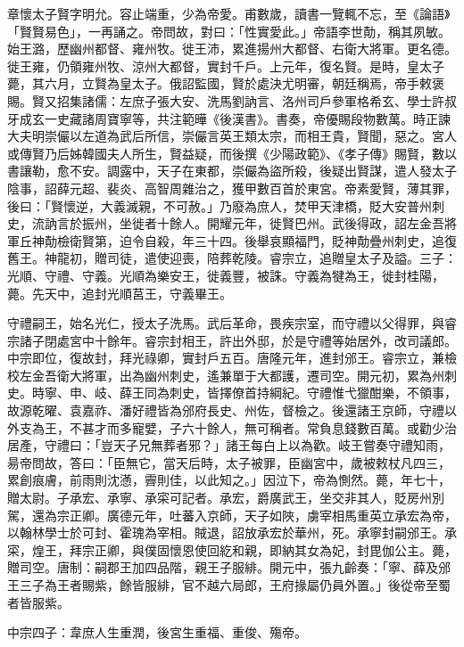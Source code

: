 \begin{pinyinscope}
 章懷太子賢字明允。容止端重，少為帝愛。甫數歲，讀書一覽輒不忘，至《論語》「賢賢易色」，一再誦之。帝問故，對曰：「性實愛此。」帝語李世勣，稱其夙敏。始王潞，歷幽州都督、雍州牧。徙王沛，累進揚州大都督、右衛大將軍。更名德。徙王雍，仍領雍州牧、涼州大都督，實封千戶。上元年，復名賢。是時，皇太子薨，其六月，立賢為皇太子。俄詔監國，賢於處決尤明審，朝廷稱焉，帝手敕褒賜。賢又招集諸儒：左庶子張大安、洗馬劉訥言、洛州司戶參軍格希玄、學士許叔牙成玄一史藏諸周寶寧等，共注範曄《後漢書》。書奏，帝優賜段物數萬。時正諫大夫明崇儼以左道為武后所信，崇儼言英王類太宗，而相王貴，賢聞，惡之。宮人或傳賢乃后姊韓國夫人所生，賢益疑，而後撰《少陽政範》、《孝子傳》賜賢，數以書讓勒，愈不安。調露中，天子在東都，崇儼為盜所殺，後疑出賢謀，遣人發太子陰事，詔薛元超、裴炎、高智周雜治之，獲甲數百首於東宮。帝素愛賢，薄其罪，後曰：「賢懷逆，大義滅親，不可赦。」乃廢為庶人，焚甲天津橋，貶大安普州刺史，流訥言於振州，坐徙者十餘人。開耀元年，徙賢巴州。武後得政，詔左金吾將軍丘神勣檢衛賢第，迫令自殺，年三十四。後舉哀顯福門，貶神勣疊州刺史，追復舊王。神龍初，贈司徒，遣使迎喪，陪葬乾陵。睿宗立，追贈皇太子及謚。三子：光順、守禮、守義。光順為樂安王，徙義豐，被誅。守義為犍為王，徙封桂陽，薨。先天中，追封光順莒王，守義畢王。



 守禮嗣王，始名光仁，授太子洗馬。武后革命，畏疾宗室，而守禮以父得罪，與睿宗諸子閉處宮中十餘年。睿宗封相王，許出外邸，於是守禮等始居外，改司議郎。中宗即位，復故封，拜光祿卿，實封戶五百。唐隆元年，進封邠王。睿宗立，兼檢校左金吾衛大將軍，出為幽州刺史，遙兼單于大都護，遷司空。開元初，累為州刺史。時寧、申、岐、薛王同為刺史，皆擇僚首持綱紀。守禮惟弋獵酣樂，不領事，故源乾曜、袁嘉祚、潘好禮皆為邠府長史、州佐，督檢之。後還諸王京師，守禮以外支為王，不甚才而多寵嬖，子六十餘人，無可稱者。常負息錢數百萬。或勸少治居產，守禮曰：「豈天子兄無葬者邪？」諸王每白上以為歡。岐王嘗奏守禮知雨，昜帝問故，答曰：「臣無它，當天后時，太子被罪，臣幽宮中，歲被敕杖凡四三，累創痕膚，前雨則沈懣，霽則佳，以此知之。」因泣下，帝為惻然。薨，年七十，贈太尉。子承宏、承寧、承寀可記者。承宏，爵廣武王，坐交非其人，貶房州別駕，還為宗正卿。廣德元年，吐蕃入京師，天子如陜，虜宰相馬重英立承宏為帝，以翰林學士於可封、霍瑰為宰相。賊退，詔放承宏於華州，死。承寧封嗣邠王。承寀，煌王，拜宗正卿，與僕固懷恩使回紇和親，即納其女為妃，封毘伽公主。薨，贈司空。唐制：嗣郡王加四品階，親王子服緋。開元中，張九齡奏：「寧、薛及邠王三子為王者賜紫，餘皆服緋，官不越六局郎，王府掾屬仍員外置。」後從帝至蜀者皆服紫。



 中宗四子：韋庶人生重潤，後宮生重福、重俊、殤帝。




\end{pinyinscope}
